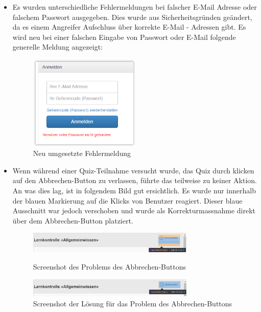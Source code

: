 \begin{itemize}
	\item Es wurden unterschiedliche Fehlermeldungen bei falscher E-Mail Adresse oder falschem Passwort ausgegeben. Dies wurde aus Sicherheitsgründen geändert, da es einem Angreifer Aufschluss über korrekte E-Mail - Adressen gibt. Es wird neu bei einer falschen Eingabe von Passwort oder E-Mail folgende generelle Meldung angezeigt:	
	\begin{figure}[H]
		\centering
		\includegraphics[width=0.5\textwidth]
		{Images/nachher_Email-und-Passwort.PNG}
		\caption{Neu umgesetzte Fehlermeldung}
	\end{figure}

	\item Wenn während einer Quiz-Teilnahme versucht wurde, das Quiz durch klicken auf den Abbrechen-Button zu verlassen, führte das teilweise zu keiner Aktion. An was dies lag, ist in folgendem Bild gut ersichtlich. Es wurde nur innerhalb der blauen Markierung auf die Klicks von Benutzer reagiert. Dieser blaue Ausschnitt war jedoch verschoben und wurde als Korrekturmassnahme direkt über dem Abbrechen-Button platziert.
	
	\begin{figure}[H]
		\centering
		\includegraphics[width=0.75\textwidth]
		{Images/CancelButtonProblem.PNG}
		\caption{Screenshot des Problems des Abbrechen-Buttons}
		\cite{mobilequiz.ch}
	\end{figure}
	
	\begin{figure}[H]
		\centering
		\includegraphics[width=0.75\textwidth]
		{Images/CancelButtonFix.PNG}
		\caption{Screenshot der Lösung für das Problem des Abbrechen-Buttons}
	\end{figure}
	

\end{itemize}
